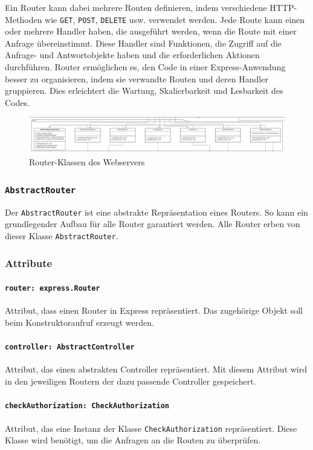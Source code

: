 \documentclass{entwurfsheft}
\begin{document}
\begin{sloppypar}
Ein Router kann dabei mehrere Routen definieren, indem verschiedene HTTP-Methoden wie \texttt{GET}, \texttt{POST}, \texttt{DELETE} usw. verwendet werden.
Jede Route kann einen oder mehrere Handler haben, die ausgeführt werden, wenn die Route mit einer Anfrage übereinstimmt.
Diese Handler sind Funktionen, die Zugriff auf die Anfrage- und Antwortobjekte haben und die erforderlichen Aktionen durchführen.
Router ermöglichen es, den Code in einer Express-Anwendung besser zu organisieren, indem sie verwandte Routen und deren Handler gruppieren.
Dies erleichtert die Wartung, Skalierbarkeit und Lesbarkeit des Codes.

\begin{figure}[htp]
    \centering
    \includegraphics[width = 1\textwidth]{images/webserver/router.pdf}
    \caption{Router-Klassen des Webservers}
    \label{fig:router}
\end{figure}

\subsubsection{\texttt{AbstractRouter}}\label{sec:AbstractRouter}
Der \texttt{AbstractRouter} ist eine abstrakte Repräsentation eines Routers. So kann ein grundlegender Aufbau für alle Router garantiert werden. Alle Router erben von dieser Klasse \texttt{AbstractRouter}.
\subsubsection*{Attribute}
\paragraph{\texttt{router: express.Router}}
Attribut, dass einen Router in Express repräsentiert. Das zugehörige Objekt soll beim Konstruktoraufruf erzeugt werden.
\paragraph{\texttt{controller: AbstractController}}
Attribut, das einen abstrakten Controller repräsentiert. Mit diesem Attribut wird in den jeweiligen Routern der dazu passende Controller gespeichert.
\paragraph{\texttt{checkAuthorization: CheckAuthorization}}
Attribut, das eine Instanz der Klasse \texttt{Check\-Authorization} repräsentiert. Diese Klasse wird benötigt, um die Anfragen an die Routen zu überprüfen.

\end{sloppypar}
\end{document}
